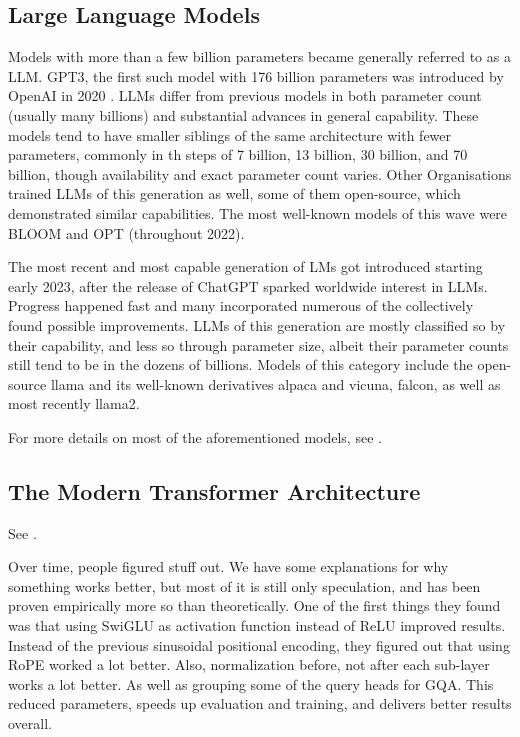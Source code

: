 
\subsection{Large Language Models}\label{sub:llm}
Models with more than a few billion parameters became generally referred to as a \acrlong{LLM}. \gls{GPT3}, the first such model with 176 billion parameters was introduced by \gls{OpenAI} in 2020 \cite{brown_language_2020}.
\glspl{LLM} differ from previous models in both parameter count (usually many billions) and substantial advances in general capability.
These models tend to have smaller siblings of the same architecture with fewer parameters, commonly in th steps of 7 billion, 13 billion, 30 billion, and 70 billion, though availability and exact parameter count varies.
Other Organisations trained \glspl{LLM} of this generation as well, some of them open-source, which demonstrated similar capabilities.
The most well-known models of this wave were \gls{BLOOM} and \gls{OPT} (throughout 2022).

The most recent and most capable generation of \glspl{LM} got introduced starting early 2023, after the release of \gls{ChatGPT} sparked worldwide interest in \glspl{LLM}. Progress happened fast and many incorporated numerous of the collectively found possible improvements. \glspl{LLM} of this generation are mostly classified so by their capability, and less so through parameter size, albeit their parameter counts still tend to be in the dozens of billions. Models of this category include the open-source \gls{llama} and its well-known derivatives \gls{alpaca} and \gls{vicuna}, \gls{falcon}, as well as most recently \gls{llama2}.

For more details on most of the aforementioned models, see .

\subsection{The Modern Transformer Architecture}\label{sub:modern}
See .

Over time, people figured stuff out. We have some explanations for why something works better, but most of it is still only speculation, and has been proven empirically more so than theoretically. 
One of the first things they found was that using SwiGLU as activation function instead of ReLU improved results. 
Instead of the previous sinusoidal positional encoding, they figured out that using \gls{RoPE} worked a lot better.
Also, normalization before, not after each sub-layer works a lot better.
As well as grouping some of the query heads for \gls{GQA}. This reduced parameters, speeds up evaluation and training, and delivers better results overall.


